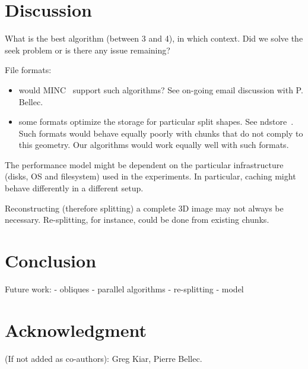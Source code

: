 \documentclass[10pt, conference, compsocconf]{IEEEtran}
\begin{document}
\newpage

\section{Discussion}
\label{sec:discussion}

What is the best algorithm (between 3 and 4), in which context. Did we
solve the seek problem or is there any issue remaining?

File formats:
\begin{itemize}
\item would MINC~\cite{vincent2016minc} support such algorithms? See on-going email discussion
with P. Bellec.
\item some formats optimize the storage for particular split shapes. See
  ndstore~\cite{burns2013open}. Such formats would behave equally
  poorly with chunks that do not comply to this geometry. Our
  algorithms would work equally well with such formats.
\end{itemize}

The performance model might be dependent on the particular
infrastructure (disks, OS and filesystem) used in the experiments. In
particular, caching might behave differently in a different setup.

Reconstructing (therefore splitting) a complete 3D image may not
always be necessary. Re-splitting, for instance, could be done from
existing chunks.

\section{Conclusion}

Future work:
- obliques
- parallel algorithms
- re-splitting
- model

\section*{Acknowledgment}

(If not added as co-authors): Greg Kiar, Pierre Bellec.



\end{document}
